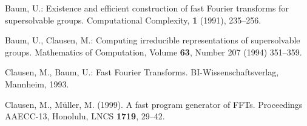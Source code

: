 \documentclass{llncs}
\begin{document}
\begin{thebibliography}{}

Baum, U.: Existence and efficient construction of fast Fourier transforms for supersolvable groups.
Computational Complexity, {\bf 1} (1991), 235--256.

Baum, U., Clausen, M.:
Computing irreducible representations of supersolvable groups.
Mathematics of Computation, Volume {\bf 63}, Number 207
(1994) 351--359.

Clausen, M., Baum, U.: Fast Fourier Transforms. 
BI-Wissenschaftsverlag, Mann\-heim, 1993.

Clausen, M., M\"uller, M. (1999). 
A fast program generator of FFTs.
Proceedings AAECC-13, Honolulu, LNCS {\bf 1719}, 29--42.

\end{thebibliography}
\end{document}
